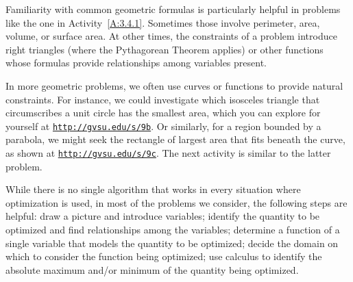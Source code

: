 


Familiarity with common geometric formulas is particularly helpful in problems like the one in Activity~\ref{A:3.4.1}.  Sometimes those involve perimeter, area, volume, or surface area.  At other times, the constraints of a problem introduce right triangles (where the Pythagorean Theorem applies) or other functions whose formulas provide relationships among variables present.



In more geometric problems, we often use curves or functions to provide natural constraints.  For instance, we could investigate which isosceles triangle that circumscribes a unit circle has the smallest area, which you can explore for yourself at \href{http://gvsu.edu/s/9b}{\texttt{http://gvsu.edu/s/9b}}.  Or similarly, for a region bounded by a parabola, we might seek the rectangle of largest area that fits beneath the curve, as shown at \href{http://gvsu.edu/s/9c}{\texttt{http://gvsu.edu/s/9c}}.  The next activity is similar to the latter problem.



\begin{summary}
\item While there is no single algorithm that works in every situation where optimization is used, in most of the problems we consider, the following steps are helpful:  draw a picture and introduce variables; identify the quantity to be optimized and find relationships among the variables; determine a function of a single variable that models the quantity to be optimized; decide the domain on which to consider the function being optimized; use calculus to identify the absolute maximum and/or minimum of the quantity being optimized.
\end{summary}

\clearpage

 

\cleardoublepage